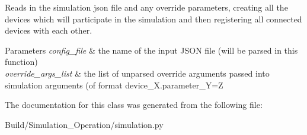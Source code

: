 Reads in the simulation json file and any override parameters, creating all the devices which will participate in the simulation and then registering all connected devices with each other. 


\begin{DoxyParams}{Parameters}
{\em config\+\_\+file} & the name of the input J\+S\+ON file (will be parsed in this function) \\
\hline
{\em override\+\_\+args\+\_\+list} & the list of unparsed override arguments passed into simulation arguments (of format \textquotesingle{}device\+\_\+\+X.\+parameter\+\_\+Y=Z\textquotesingle{} \\
\hline
\end{DoxyParams}


The documentation for this class was generated from the following file\+:\begin{DoxyCompactItemize}
\item 
Build/\+Simulation\+\_\+\+Operation/simulation.\+py\end{DoxyCompactItemize}
